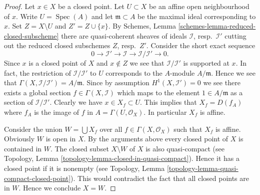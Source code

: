 \documentclass{stacks-project}
\theoremstyle{plain}
\theoremstyle{definition}
\theoremstyle{remark}
\numberwithin{equation}{subsection}
\def\Spec{\mathop{\mathrm{Spec}}}
\begin{document}
\begin{proof}
Let $x \in X$ be a closed point. Let $U \subset X$ be an affine open
neighbourhood of $x$. Write $U = \Spec(A)$ and let
$\mathfrak m \subset A$ be the maximal ideal corresponding to $x$.
Set $Z = X \setminus U$ and $Z' = Z \cup \{x\}$.
By Schemes, Lemma \ref{schemes-lemma-reduced-closed-subscheme} there
are quasi-coherent sheaves of ideals
$\mathcal{I}$, resp.\ $\mathcal{I}'$ cutting out
the reduced closed subschemes $Z$, resp.\ $Z'$.
Consider the short exact sequence
$$
0 \to \mathcal{I}' \to \mathcal{I} \to \mathcal{I}/\mathcal{I}' \to 0.
$$
Since $x$ is a closed point of $X$ and $x \not \in Z$ we see that
$\mathcal{I}/\mathcal{I}'$ is supported at $x$. In fact, the restriction
of $\mathcal{I}/\mathcal{I'}$ to $U$ corresponds to the $A$-module
$A/\mathfrak m$. Hence we see that $\Gamma(X, \mathcal{I}/\mathcal{I'})
= A/\mathfrak m$. Since by assumption $H^1(X, \mathcal{I}') = 0$
we see there exists a global section $f \in \Gamma(X, \mathcal{I})$
which maps to the element $1 \in A/\mathfrak m$ as a section of
$\mathcal{I}/\mathcal{I'}$. Clearly we have
$x \in X_f \subset U$. This implies that $X_f = D(f_A)$ where
$f_A$ is the image of $f$ in $A = \Gamma(U, \mathcal{O}_X)$.
In particular $X_f$ is affine.

\medskip\noindent
Consider the union $W = \bigcup X_f$ over all $f \in \Gamma(X, \mathcal{O}_X)$
such that $X_f$ is affine. Obviously $W$ is open in $X$.
By the arguments above every closed point of
$X$ is contained in $W$. The closed subset $X \setminus W$ of $X$
is also quasi-compact
(see Topology, Lemma \ref{topology-lemma-closed-in-quasi-compact}).
Hence it has a closed point if it is nonempty (see
Topology, Lemma \ref{topology-lemma-quasi-compact-closed-point}).
This would contradict the fact that all closed points are in
$W$. Hence we conclude $X = W$.


\end{proof}
\end{document}
